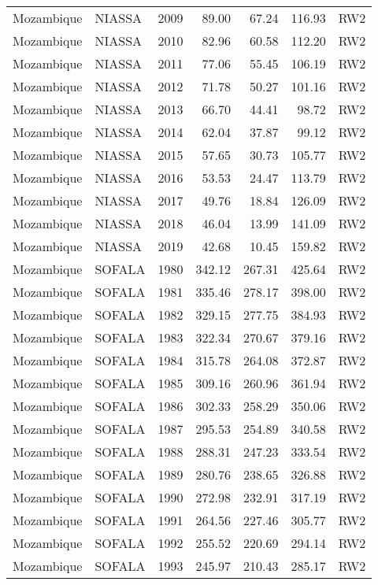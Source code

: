 \begin{longtable}{lllrrrl}
  Mozambique & NIASSA & 2009 & 89.00 & 67.24 & 116.93 & RW2 \\ 
  Mozambique & NIASSA & 2010 & 82.96 & 60.58 & 112.20 & RW2 \\ 
  Mozambique & NIASSA & 2011 & 77.06 & 55.45 & 106.19 & RW2 \\ 
  Mozambique & NIASSA & 2012 & 71.78 & 50.27 & 101.16 & RW2 \\ 
  Mozambique & NIASSA & 2013 & 66.70 & 44.41 & 98.72 & RW2 \\ 
  Mozambique & NIASSA & 2014 & 62.04 & 37.87 & 99.12 & RW2 \\ 
  Mozambique & NIASSA & 2015 & 57.65 & 30.73 & 105.77 & RW2 \\ 
  Mozambique & NIASSA & 2016 & 53.53 & 24.47 & 113.79 & RW2 \\ 
  Mozambique & NIASSA & 2017 & 49.76 & 18.84 & 126.09 & RW2 \\ 
  Mozambique & NIASSA & 2018 & 46.04 & 13.99 & 141.09 & RW2 \\ 
  Mozambique & NIASSA & 2019 & 42.68 & 10.45 & 159.82 & RW2 \\ 
  Mozambique & SOFALA & 1980 & 342.12 & 267.31 & 425.64 & RW2 \\ 
  Mozambique & SOFALA & 1981 & 335.46 & 278.17 & 398.00 & RW2 \\ 
  Mozambique & SOFALA & 1982 & 329.15 & 277.75 & 384.93 & RW2 \\ 
  Mozambique & SOFALA & 1983 & 322.34 & 270.67 & 379.16 & RW2 \\ 
  Mozambique & SOFALA & 1984 & 315.78 & 264.08 & 372.87 & RW2 \\ 
  Mozambique & SOFALA & 1985 & 309.16 & 260.96 & 361.94 & RW2 \\ 
  Mozambique & SOFALA & 1986 & 302.33 & 258.29 & 350.06 & RW2 \\ 
  Mozambique & SOFALA & 1987 & 295.53 & 254.89 & 340.58 & RW2 \\ 
  Mozambique & SOFALA & 1988 & 288.31 & 247.23 & 333.54 & RW2 \\ 
  Mozambique & SOFALA & 1989 & 280.76 & 238.65 & 326.88 & RW2 \\ 
  Mozambique & SOFALA & 1990 & 272.98 & 232.91 & 317.19 & RW2 \\ 
  Mozambique & SOFALA & 1991 & 264.56 & 227.46 & 305.77 & RW2 \\ 
  Mozambique & SOFALA & 1992 & 255.52 & 220.69 & 294.14 & RW2 \\ 
  Mozambique & SOFALA & 1993 & 245.97 & 210.43 & 285.17 & RW2 \\ 

\end{longtable}
